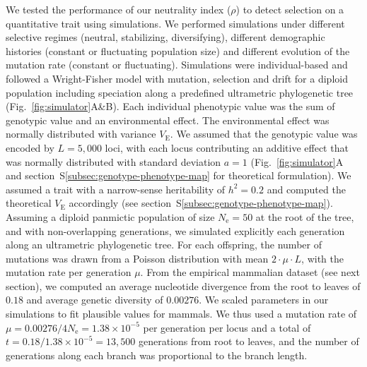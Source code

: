 \documentclass{article}
\newcommand{\Multiply}{\cdot}
\newcommand{\Ne}{N_{\text{e}}}
\newcommand{\Time}{t}
\newcommand{\Heritability}{h^2}
\newcommand{\MutationRate}{\mu}
\newcommand{\NbrLoci}{L}
\newcommand{\VarEnv}{V_{\mathrm{E}}}
\newcommand{\NI}{\rho}
\begin{document}
We tested the performance of our neutrality index ($\NI$) to detect selection on a quantitative trait using simulations.
We performed simulations under different selective regimes (neutral, stabilizing, diversifying), different demographic histories (constant or fluctuating population size) and different evolution of the mutation rate (constant or fluctuating).
Simulations were individual-based and followed a Wright-Fisher model with mutation, selection and drift for a diploid population including speciation along a predefined ultrametric phylogenetic tree (Fig.~\ref{fig:simulator}A\&B).
Each individual phenotypic value was the sum of genotypic value and an environmental effect.
The environmental effect was normally distributed with variance $\VarEnv$.
We assumed that the genotypic value was encoded by $\NbrLoci=5,000$ loci, with each locus contributing an additive effect that was normally distributed with standard deviation $a=1$ (Fig.~\ref{fig:simulator}A and section~S\ref{subsec:genotype-phenotype-map} for theoretical formulation).
We assumed a trait with a narrow-sense heritability of $\Heritability=0.2$ and computed the theoretical $\VarEnv$ accordingly (see section~S\ref{subsec:genotype-phenotype-map}).
Assuming a diploid panmictic population of size $\Ne=50$ at the root of the tree, and with non-overlapping generations, we simulated explicitly each generation along an ultrametric phylogenetic tree.
For each offspring, the number of mutations was drawn from a Poisson distribution with mean $2 \Multiply \MutationRate \Multiply \NbrLoci $, with the mutation rate per generation $\MutationRate$.
From the empirical mammalian dataset (see next section), we computed an average nucleotide divergence from the root to leaves of $0.18$ and average genetic diversity of $0.00276$.
We scaled parameters in our simulations to fit plausible values for mammals.
We thus used a mutation rate of $\MutationRate=0.00276 / 4 \Ne = 1.38 \times 10^{-5}$ per generation per locus and a total of $\Time = 0.18 / 1.38 \times 10^{-5} = 13,500$ generations from root to leaves, and the number of generations along each branch was proportional to the branch length.
\end{document}
